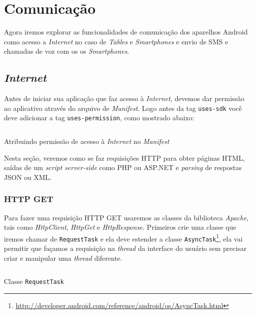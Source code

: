 \documentclass[a4paper,12pt,brazil,oneside]{book}
\begin{document}
\chapter{Comunicação}

	Agora iremos explorar as funcionalidades de comunicação dos aparelhos Android como acesso a \emph{Internet} no caso de \emph{Tables} e \emph{Smartphones} e envio de SMS e chamadas de voz com os os \emph{Smartphones}. 

\section{\emph{Internet}}

	Antes de iniciar sua aplicação que faz acesso à \emph{Internet}, devemos dar permissão ao aplicativo através do arquivo de \emph{Manifest}. Logo antes da tag \texttt{uses-sdk} você deve adicionar a tag \texttt{uses-permission}, como mostrado abaixo:

		\begin{listing}[H]
		\inputminted[linenos=true,fontsize=\small,frame=lines, framesep=2mm, tabsize=2,numbersep=5pt]{xml}{src/api/comm/permission-internet.xml}
		\caption{Atribuindo permissão de acesso à \emph{Internet} no \emph{Manifest}}
		\label{code:permission-internet}
		\end{listing}

		Nesta seção, veremos como se faz requisições HTTP para obter páginas HTML, saídas de um \emph{script server-side} como PHP ou ASP.NET e \emph{parsing} de respostas JSON ou XML.		 

		\subsection{HTTP GET}

		Para fazer uma requisição HTTP GET usaremos as classes da biblioteca \emph{Apache}, tais como \emph{HttpClient}, \emph{HttpGet} e \emph{HttpResponse}. Primeiros crie uma classe que iremos chamar de \texttt{RequestTask} e ela deve estender a classe \texttt{AsyncTask}\footnote{\href{http://developer.android.com/reference/android/os/AsyncTask.html}{http://developer.android.com/reference/android/os/AsyncTask.html}}, ela vai permitir que façamos a requisição na \emph{thread} da interface do usuário sem precisar criar e manipular uma \emph{thread} diferente.

		\begin{listing}[H]
		\inputminted[linenos=true,fontsize=\small,frame=lines, framesep=2mm, tabsize=2,numbersep=5pt]{java}{src/api/comm/asynctask.java}
		\caption{Classe \texttt{RequestTask}}
		\label{code:requesttask}
		\end{listing}
\end{document}
